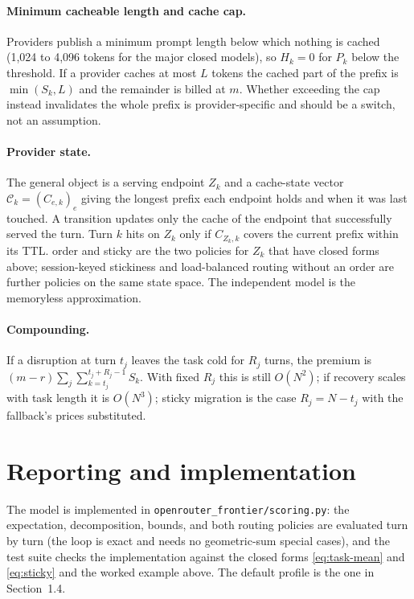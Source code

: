 \documentclass[11pt]{article}
\begin{document}
\paragraph{Minimum cacheable length and cache cap.}
Providers publish a minimum prompt length below which nothing is cached
(1{,}024 to 4{,}096 tokens for the major closed models), so $H_k = 0$ for
$P_k$ below the threshold. If a provider caches at most $L$ tokens the cached
part of the prefix is $\min(S_k, L)$ and the remainder is billed at $m$.
Whether exceeding the cap instead invalidates the whole prefix is
provider-specific and should be a switch, not an assumption.

\paragraph{Provider state.}
The general object is a serving endpoint $Z_k$ and a cache-state vector
$\mathcal{C}_k = (C_{e,k})_e$ giving the longest prefix each endpoint holds and
when it was last touched. A transition updates only the cache of the endpoint
that successfully served the turn. Turn $k$ hits on $Z_k$ only if $C_{Z_k,k}$
covers the current prefix within its TTL. \textsf{order} and \textsf{sticky}
are the two policies for $Z_k$ that have closed forms above; session-keyed
stickiness and load-balanced routing without an order are further policies on
the same state space. The independent model is the memoryless approximation.

\paragraph{Compounding.}
If a disruption at turn $t_j$ leaves the task cold for $R_j$ turns, the
premium is $(m - r) \sum_j \sum_{k = t_j}^{t_j + R_j - 1} S_k$. With fixed
$R_j$ this is still $O(N^2)$; if recovery scales with task length it is
$O(N^3)$; \textsf{sticky} migration is the case $R_j = N - t_j$ with the
fallback's prices substituted.

\section{Reporting and implementation}

The model is implemented in \texttt{openrouter\_frontier/scoring.py}: the expectation,
decomposition, bounds, and both routing policies are evaluated turn by turn (the loop is
exact and needs no geometric-sum special cases), and the test suite checks the
implementation against the closed forms \eqref{eq:task-mean} and \eqref{eq:sticky} and
the worked example above. The default profile is the one in Section~1.4.
\end{document}
